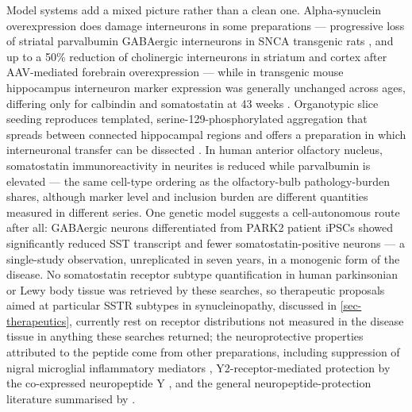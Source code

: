 \documentclass[11pt]{article}
\begin{document}
Model systems add a mixed picture rather than a clean one. Alpha-synuclein overexpression does damage interneurons in some preparations --- progressive loss of striatal parvalbumin GABAergic interneurons in SNCA transgenic rats \citep{Paldino2022}, and up to a 50\% reduction of cholinergic interneurons in striatum and cortex after AAV-mediated forebrain overexpression \citep{AldrinKirk2014} --- while in transgenic mouse hippocampus interneuron marker expression was generally unchanged across ages, differing only for calbindin and somatostatin at 43 weeks \citep{FloresCuadrado2016}. Organotypic slice seeding reproduces templated, serine-129-phosphorylated aggregation that spreads between connected hippocampal regions and offers a preparation in which interneuronal transfer can be dissected \citep{Elfarrash2019}. In human anterior olfactory nucleus, somatostatin immunoreactivity in neurites is reduced while parvalbumin is elevated \citep{UbedaBanon2017} --- the same cell-type ordering as the olfactory-bulb pathology-burden shares, although marker level and inclusion burden are different quantities measured in different series. One genetic model suggests a cell-autonomous route after all: GABAergic neurons differentiated from PARK2 patient iPSCs showed significantly reduced SST transcript and fewer somatostatin-positive neurons \citep{Iwasawa2019} --- a single-study observation, unreplicated in seven years, in a monogenic form of the disease. No somatostatin receptor subtype quantification in human parkinsonian or Lewy body tissue was retrieved by these searches, so therapeutic proposals aimed at particular SSTR subtypes in synucleinopathy, discussed in \ref{sec-therapeutics}, currently rest on receptor distributions not measured in the disease tissue in anything these searches returned; the neuroprotective properties attributed to the peptide come from other preparations, including suppression of nigral microglial inflammatory mediators \citep{BAI2015}, Y2-receptor-mediated protection by the co-expressed neuropeptide Y \citep{Decressac2012}, and the general neuropeptide-protection literature summarised by \citet{Behl2022}.
\end{document}

